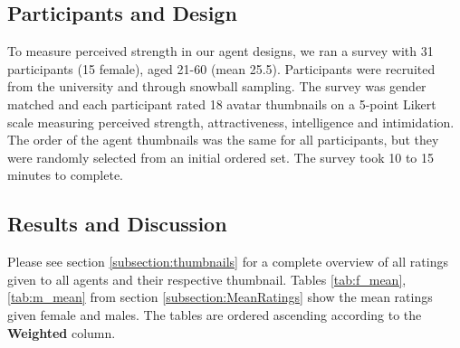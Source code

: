 \subsection{Participants and Design}
To measure perceived strength in our agent designs, we ran a survey with 31 participants (15 female), aged 21-60 (mean 25.5). Participants were recruited from the university and through snowball sampling. The survey was gender matched and each participant rated 18 avatar thumbnails on a 5-point Likert  scale measuring perceived strength, attractiveness, intelligence and intimidation. The order of the agent thumbnails was the same for all participants, but they were randomly selected from an initial ordered set. The survey took 10 to 15 minutes to complete.

\subsection{Results and Discussion}
\label{section:surveyResults}
Please see section \ref{subsection:thumbnails} for a complete overview of all ratings given to all agents and their respective thumbnail. Tables \ref{tab:f_mean}, \ref{tab:m_mean} from section \ref{subsection:MeanRatings} show the mean ratings given female and males. The tables are ordered ascending according to the \textbf{Weighted} column.



